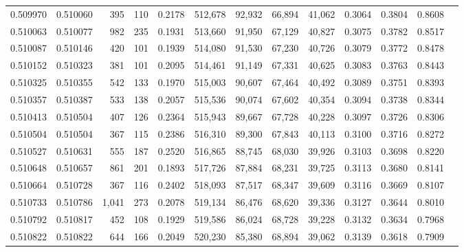 \begin{tabular}{rrrrrrrrrrrrr}
0.509970 & 0.510060 &   395 &   110 &                                     0.2178 & 512,678 &  92,932 &  66,894 &  41,062 & 0.3064 & 0.3804 & 0.8608 \\
0.510063 & 0.510077 &   982 &   235 &                                     0.1931 & 513,660 &  91,950 &  67,129 &  40,827 & 0.3075 & 0.3782 & 0.8517 \\
0.510087 & 0.510146 &   420 &   101 &                                     0.1939 & 514,080 &  91,530 &  67,230 &  40,726 & 0.3079 & 0.3772 & 0.8478 \\
0.510152 & 0.510323 &   381 &   101 &                                     0.2095 & 514,461 &  91,149 &  67,331 &  40,625 & 0.3083 & 0.3763 & 0.8443 \\
0.510325 & 0.510355 &   542 &   133 &                                     0.1970 & 515,003 &  90,607 &  67,464 &  40,492 & 0.3089 & 0.3751 & 0.8393 \\
0.510357 & 0.510387 &   533 &   138 &                                     0.2057 & 515,536 &  90,074 &  67,602 &  40,354 & 0.3094 & 0.3738 & 0.8344 \\
0.510413 & 0.510504 &   407 &   126 &                                     0.2364 & 515,943 &  89,667 &  67,728 &  40,228 & 0.3097 & 0.3726 & 0.8306 \\
0.510504 & 0.510504 &   367 &   115 &                                     0.2386 & 516,310 &  89,300 &  67,843 &  40,113 & 0.3100 & 0.3716 & 0.8272 \\
0.510527 & 0.510631 &   555 &   187 &                                     0.2520 & 516,865 &  88,745 &  68,030 &  39,926 & 0.3103 & 0.3698 & 0.8220 \\
0.510648 & 0.510657 &   861 &   201 &                                     0.1893 & 517,726 &  87,884 &  68,231 &  39,725 & 0.3113 & 0.3680 & 0.8141 \\
0.510664 & 0.510728 &   367 &   116 &                                     0.2402 & 518,093 &  87,517 &  68,347 &  39,609 & 0.3116 & 0.3669 & 0.8107 \\
0.510733 & 0.510786 & 1,041 &   273 &                                     0.2078 & 519,134 &  86,476 &  68,620 &  39,336 & 0.3127 & 0.3644 & 0.8010 \\
0.510792 & 0.510817 &   452 &   108 &                                     0.1929 & 519,586 &  86,024 &  68,728 &  39,228 & 0.3132 & 0.3634 & 0.7968 \\
0.510822 & 0.510822 &   644 &   166 &                                     0.2049 & 520,230 &  85,380 &  68,894 &  39,062 & 0.3139 & 0.3618 & 0.7909 \\

\end{tabular}
